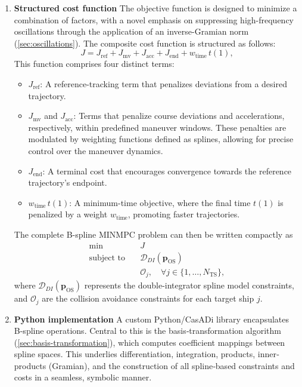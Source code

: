 \begin{enumerate}
  \item \textbf{Structured cost function}  
    The objective function is designed to minimize a combination of factors, with a novel emphasis on suppressing high-frequency oscillations through the application of an inverse-Gramian norm (\cref{sec:oscillations}). The composite cost function is structured as follows:
        \begin{equation}
          J = J_\text{ref} + J_\text{mv} + J_\text{acc} + J_\text{end} + w_\text{time}\,t(1),
        \end{equation}
        This function comprises four distinct terms:
        \begin{itemize}
          \item \(J_\text{ref}\): A reference-tracking term that penalizes deviations from a desired trajectory.
          \item \(J_\text{mv}\) and \(J_\text{acc}\): Terms that penalize course deviations and accelerations, respectively, within predefined maneuver windows. These penalties are modulated by weighting functions defined as splines, allowing for precise control over the maneuver dynamics.
          \item \(J_\text{end}\): A terminal cost that encourages convergence towards the reference trajectory's endpoint.
          \item \(w_\text{time}\,t(1)\): A minimum-time objective, where the final time \(t(1)\) is penalized by a weight \(w_\text{time}\), promoting faster trajectories.
        \end{itemize}

        The complete B-spline MINMPC problem can then be written compactly as
        \begin{equation}
        \label{eq:minmpc-compact}
            \begin{aligned}
                \min
                \quad & J
                \\
                \text{subject to}\quad
                & \mathcal{D}_{DI}(\mathbf{p}_\text{OS})
                \\
                & \mathcal{O}_j,
                \quad \forall j\in \{1,\ldots,N_\text{TS}\},
            \end{aligned}
        \end{equation}
    where \(\mathcal{D}_{DI}(\mathbf{p}_\text{OS})\) represents the double-integrator spline model constraints, and \(\mathcal{O}_j\) are the collision avoidance constraints for each target ship \(j\).

  \item \textbf{Python implementation}  
    A custom Python/CasADi library encapsulates B-spline operations. Central to this is the basis‐transformation algorithm (\cref{sec:basis-transformation}), which computes coefficient mappings between spline spaces. This underlies differentiation, integration, products, inner‐products (Gramian), and the construction of all spline‐based constraints and costs in a seamless, symbolic manner.
\end{enumerate}